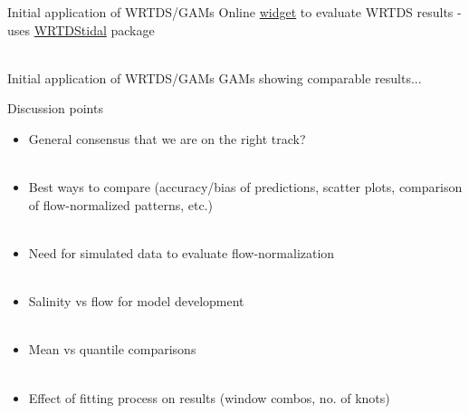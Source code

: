 \documentclass[serif]{beamer}\usepackage[]{graphicx}\usepackage[]{color}
\begin{document}
\begin{frame}{Initial application of WRTDS/GAMs}
Online \href{https://beckmw.shinyapps.io/patux_mods/}{widget} to evaluate WRTDS results - uses \href{https://github.com/fawda123/wtreg_for_estuaries}{WRTDStidal} package \\~\\
\centerline{}
\end{frame}

\begin{frame}{Initial application of WRTDS/GAMs}
GAMs showing comparable results...
\end{frame}

\begin{frame}{Discussion points}
\begin{itemize}
\item General consensus that we are on the right track?\\~\\
\item Best ways to compare (accuracy/bias of predictions, scatter plots, comparison of flow-normalized patterns, etc.) \\~\\
\item Need for simulated data to evaluate flow-normalization \\~\\ 
\item Salinity vs flow for model development \\~\\
\item Mean vs quantile comparisons \\~\\
\item Effect of fitting process on results (window combos, no. of knots)
\end{itemize}
\end{frame}
\end{document}
